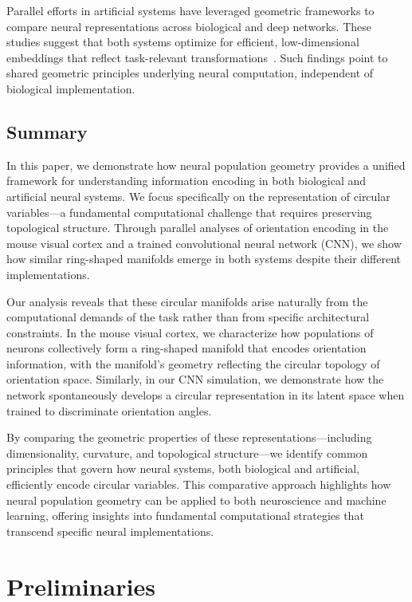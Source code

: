\documentclass[11pt,a4paper]{article}
\begin{document}
Parallel efforts in artificial systems have leveraged geometric frameworks to compare neural representations across biological and deep networks. These studies suggest that both systems optimize for efficient, low-dimensional embeddings that reflect task-relevant transformations~\cite{chung2021neural}. Such findings point to shared geometric principles underlying neural computation, independent of biological implementation.

\subsection{Summary}
In this paper, we demonstrate how neural population geometry provides a unified framework for understanding information encoding in both biological and artificial neural systems. We focus specifically on the representation of circular variables—a fundamental computational challenge that requires preserving topological structure. Through parallel analyses of orientation encoding in the mouse visual cortex and a trained convolutional neural network (CNN), we show how similar ring-shaped manifolds emerge in both systems despite their different implementations.

Our analysis reveals that these circular manifolds arise naturally from the computational demands of the task rather than from specific architectural constraints. In the mouse visual cortex, we characterize how populations of neurons collectively form a ring-shaped manifold that encodes orientation information, with the manifold's geometry reflecting the circular topology of orientation space. Similarly, in our CNN simulation, we demonstrate how the network spontaneously develops a circular representation in its latent space when trained to discriminate orientation angles.

By comparing the geometric properties of these representations---including dimensionality, curvature, and topological structure---we identify common principles that govern how neural systems, both biological and artificial, efficiently encode circular variables. This comparative approach highlights how neural population geometry can be applied to both neuroscience and machine learning, offering insights into fundamental computational strategies that transcend specific neural implementations.

\section{Preliminaries}
\end{document}
